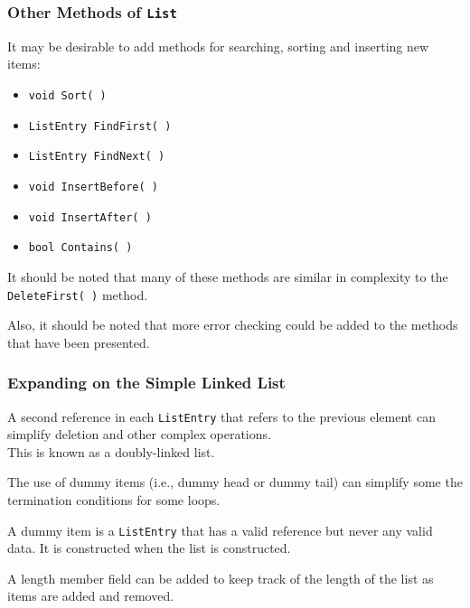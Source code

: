 \begin{frame}
\frametitle{Other Methods of \texttt{List}}

It may be desirable to add methods for searching, sorting and inserting new items:
\begin{itemize}
	\item \texttt{void Sort( )}
	\item \texttt{ListEntry FindFirst( )}
	\item \texttt{ListEntry FindNext( )}
	\item \texttt{void InsertBefore( )}
	\item \texttt{void InsertAfter( )}
	\item \texttt{bool Contains( )}
\end{itemize}
It should be noted that many of these methods are similar in complexity to the \texttt{DeleteFirst( )} method.

Also, it should be noted that more error checking could be added to the methods that have been presented.

\end{frame}

\begin{frame}
\frametitle{Expanding on the Simple Linked List}

A second reference in each \texttt{ListEntry} that refers to the previous element can simplify deletion and other complex operations.\\
\quad This is known as a doubly-linked list.

The use of dummy items (i.e., dummy head or dummy tail) can simplify some the termination conditions for some loops.

A dummy item is a \texttt{ListEntry} that has a valid reference but never any valid data. It is constructed when the list is constructed.

A length member field can be added to keep track of the length of the list as items are added and removed.

\end{frame}



